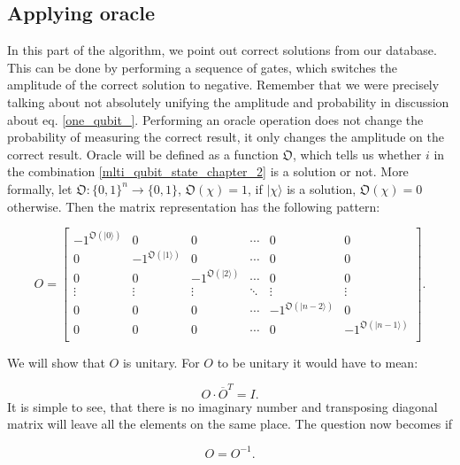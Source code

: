 \subsection{Applying oracle}
In this part of the algorithm, we point out correct solutions from our database. This can be done by performing a sequence of gates, which switches the amplitude of the correct solution to negative. Remember that we were precisely talking about not absolutely unifying the amplitude and probability in discussion about eq. \ref{one_qubit_}. Performing an oracle operation does not change the probability of measuring the correct result, it only changes the amplitude on the correct result. Oracle will be defined as a function $\mathfrak{O}$, which tells us whether $i$ in the combination \ref{mlti_qubit_state_chapter_2} is a solution or not. More formally, let $\mathfrak{O}:\{0,1\}^n \rightarrow \{0,1\}$, $\mathfrak{O}(\chi)=1$, if $|\chi\rangle$ is a solution, $\mathfrak{O}(\chi)=0$ otherwise. Then the matrix representation has the following pattern:

\begin{equation}
O = 
    \begin{bmatrix}
        -1^{\mathfrak{O}(|0\rangle)} & 0 & 0 & \cdots  & 0 & 0\\ 
        0 & -1^{\mathfrak{O}(|1\rangle)} & 0 & \cdots  & 0 & 0\\
        0 & 0 & -1^{\mathfrak{O}(|2\rangle)} & \cdots  & 0 & 0 \\
        \vdots & \vdots & \vdots & \ddots & \vdots & \vdots \\
        0 & 0 & 0 & \cdots  & -1^{\mathfrak{O}(|n-2\rangle)} & 0 \\
        0 & 0 & 0 & \cdots  & 0 & -1^{\mathfrak{O}(|n-1\rangle)} \\

    \end{bmatrix}.
\end{equation}

We will show that $O$ is unitary. For $O$ to be unitary it would have to mean:

\begin{equation}
    O \cdot \overline{O}^T =I.
\end{equation}
It is simple to see, that there is no imaginary number and transposing diagonal matrix will leave all the elements on the same place. The question now becomes if 

\begin{equation}
    O = O^{-1}.
\end{equation}

